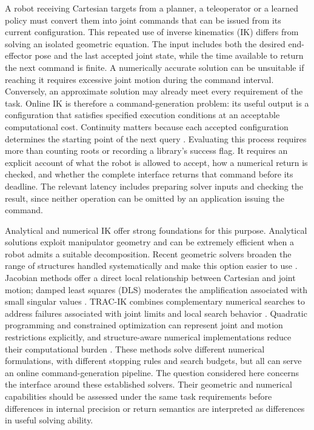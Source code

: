 \documentclass[10pt,a4paper]{article}
\begin{document}
A robot receiving Cartesian targets from a planner, a teleoperator or a learned
policy must convert them into joint commands that can be issued from its current
configuration. This repeated use of inverse kinematics (IK) differs from solving an
isolated geometric equation. The input includes both the desired end-effector pose
and the last accepted joint state, while the time available to return the next
command is finite. A numerically accurate solution can be unsuitable if reaching
it requires excessive joint motion during the command interval. Conversely, an
approximate solution may already meet every requirement of the task. Online IK is
therefore a command-generation problem: its useful output is a configuration that
satisfies specified execution conditions at an acceptable computational cost.
Continuity matters because each accepted configuration determines the starting
point of the next query \cite{siciliano1990tutorial,rakita2018relaxedik}.
Evaluating this process requires more than counting roots or recording a library's
success flag. It requires an explicit account of what the robot is allowed to
accept, how a numerical return is checked, and whether the complete interface
returns that command before its deadline. The relevant latency includes preparing
solver inputs and checking the result, since neither operation can be omitted by
an application issuing the command.

Analytical and numerical IK offer strong foundations for this purpose. Analytical
solutions exploit manipulator geometry and can be extremely efficient when a
robot admits a suitable decomposition. Recent geometric solvers broaden the
range of structures handled systematically and make this option easier to use
\cite{elias2025ikgeo,ostermeier2025eaik}. Jacobian methods offer a direct local
relationship between Cartesian and joint motion; damped least squares (DLS)
moderates the amplification associated with small singular values
\cite{wampler1986dls,nakamura1986singularity,chiaverini1994review}.
TRAC-IK combines complementary numerical searches to address failures associated
with joint limits and local search behavior \cite{beeson2015tracik}.
Quadratic programming and constrained optimization can represent joint and motion
restrictions explicitly, and structure-aware numerical implementations reduce
their computational burden \cite{wingo2024linear}.
These methods solve different numerical formulations, with different stopping
rules and search budgets, but all can serve an online command-generation pipeline.
The question considered here concerns the interface around these established
solvers. Their geometric and numerical capabilities should be assessed under
the same task requirements before differences in internal precision or return
semantics are interpreted as differences in useful solving ability.
\end{document}
